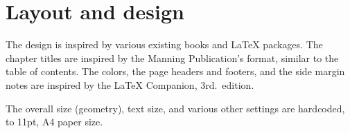 \chapter{Layout and design}\label{ch:layout}

The design is inspired by various existing books and \LaTeX{} packages.
The chapter titles are inspired by the Manning Publication's format,
similar to the table of contents. The colors, the page headers and
footers, and the side margin notes are inspired by the
\LaTeX{} Companion, 3rd.\ edition.

The overall size (geometry), text size, and various other settings
are hardcoded, to 11pt, A4 paper size.


